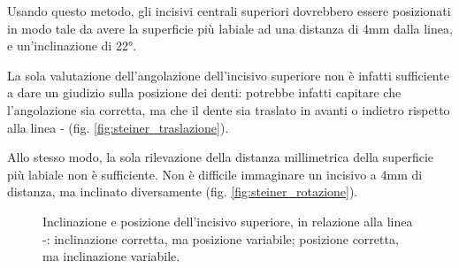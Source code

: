 Usando questo metodo, gli incisivi centrali superiori dovrebbero essere posizionati in modo tale da avere la superficie più labiale ad una distanza di 4mm dalla linea, e un'inclinazione di 22°.

La sola valutazione dell'angolazione dell'incisivo superiore non è infatti sufficiente a dare un giudizio sulla posizione dei denti: potrebbe infatti capitare che l'angolazione sia corretta, ma che il dente sia traslato in avanti o indietro rispetto alla linea - (fig. \ref{fig:steiner_traslazione}).

Allo stesso modo, la sola rilevazione della distanza millimetrica della superficie più labiale non è sufficiente. Non è difficile immaginare un incisivo a 4mm di distanza, ma inclinato diversamente (fig. \ref{fig:steiner_rotazione}).

\begin{figure}[p!]
 \quad
{}
 \centering
 \caption{Inclinazione e posizione dell'incisivo superiore, in relazione alla linea -:  inclinazione corretta, ma posizione variabile;  posizione corretta, ma inclinazione variabile.}
 \label{fig:steiner_incisivo_rototraslazione}
\end{figure}

